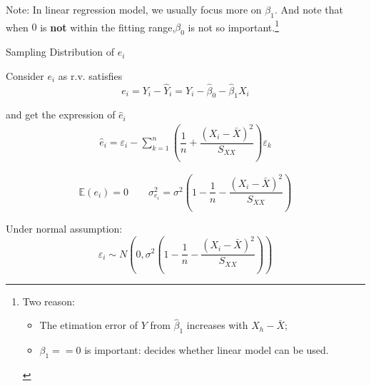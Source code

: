         
       
    
    Note: In linear regression model, we usually focus more on $ \beta_1 $. And note that when $ 0 $ is \textbf{not} within the fitting range,$ \beta_0 $ is not so important.\footnote{Two reason:\begin{itemize}[topsep=2pt,itemsep=2pt]
        \item The etimation error of $ Y $ from $ \hat{\beta}_1 $ increases with $ X_h-\bar{X} $;
        \item $ \beta_1==0  $ is important: decides whether linear model can be used. 
    \end{itemize}}


\begin{point}
    Sampling Distribution of $ e_i $ 
\end{point}
    Consider $ e_i $ as r.v. satisfies
    \begin{equation}
        e_i= Y_i-\hat{Y}_i=Y_i-\hat{\beta }_0-\hat{\beta }_1X_i
    \end{equation}

    and get the expression of $ \hat{e}_i $
    \begin{equation}
        \begin{aligned}
            \hat{e}_i=\varepsilon _i-\sum_{k=1}^n\left( \dfrac{1}{n}+\dfrac{(X_i-\bar{X})^2}{S_{XX}} \right)\varepsilon _k
        \end{aligned}
    \end{equation}
    
    
    \begin{equation}
        \mathbb{E}(e_i)=0\qquad \sigma ^2_{e_i}=\sigma ^2 \left( 1-\dfrac{1}{n}-\dfrac{(X_i-\bar{X})^2}{S_{XX}} \right)
    \end{equation}

    Under normal assumption:
    \begin{equation}\label{EqaSamplingDistributionOfResiduals}
        \varepsilon _i\sim N(0,\sigma ^2\left( 1-\dfrac{1}{n}-\dfrac{(X_i-\bar{X})^2}{S_{XX}} \right) ) 
    \end{equation}
    

